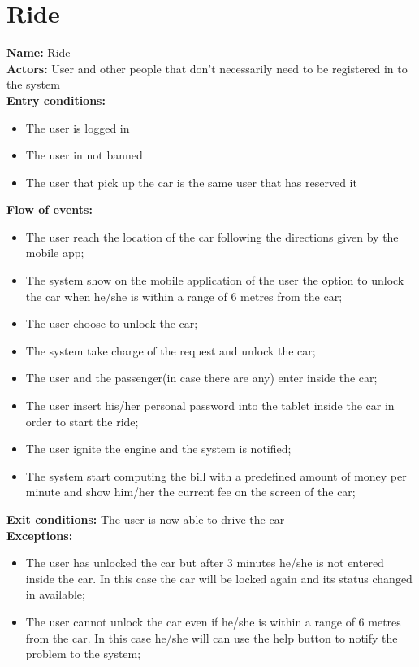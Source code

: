 \section*{Ride}
\textbf{Name:} Ride\\
\textbf{Actors:} User and other people that don't necessarily need to be registered in to the system\\
\textbf{Entry conditions:}
\begin{itemize}
\item The user is logged in
\item The user in not banned
\item The user that pick up the car is the same user that has reserved it
\end{itemize}
\textbf{Flow of events:}
\begin{itemize}
\item The user reach the location of the car following the directions given by the mobile app;
\item The system show on the mobile application of the user the option to unlock the car when he/she is within a range of 6 metres from the car;
\item The user choose to unlock the car;
\item The system take charge of the request and unlock the car;
\item The user and the passenger(in case there are any) enter inside the car;
\item The user insert his/her personal password into the tablet inside the car in order to start the ride;
\item The user ignite the engine and the system is notified;
\item The system start computing the bill with a predefined amount of money per minute and show him/her the current fee on the screen of the car;
\end{itemize}
\textbf{Exit conditions:} The user is now able to drive the car \\
\textbf{Exceptions:}
\begin{itemize}
\item The user has unlocked the car but after 3 minutes he/she is not entered inside the car. In this case  the car will be locked again and its status changed in available;
\item The user cannot unlock the car even if he/she is within a range of 6 metres from the car. In this case he/she will can use the help button  to notify the problem to the system;
\end{itemize}




